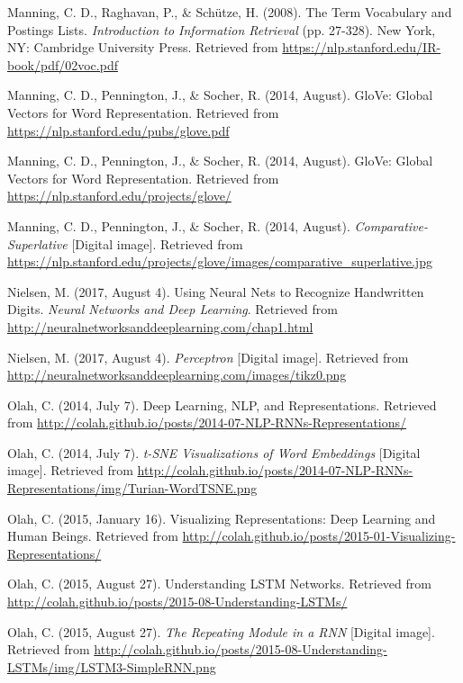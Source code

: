 \begin{thebibliography}{99}
Manning, C. D., Raghavan, P., \& Sch\"utze, H. (2008). The Term Vocabulary and Postings Lists. \textit{Introduction to Information Retrieval} (pp. 27-328). New York, NY: Cambridge University Press. Retrieved from \url{https://nlp.stanford.edu/IR-book/pdf/02voc.pdf}

Manning, C. D., Pennington, J., \& Socher, R. (2014, August). GloVe: Global Vectors for Word Representation. Retrieved from \url{https://nlp.stanford.edu/pubs/glove.pdf}

Manning, C. D., Pennington, J., \& Socher, R. (2014, August). GloVe: Global Vectors for Word Representation. Retrieved from \url{https://nlp.stanford.edu/projects/glove/}

Manning, C. D., Pennington, J., \& Socher, R. (2014, August). \textit{Comparative-Superlative} [Digital image]. Retrieved from \url{https://nlp.stanford.edu/projects/glove/images/comparative\_superlative.jpg}

Nielsen, M. (2017, August 4). Using Neural Nets to Recognize Handwritten Digits. \textit{Neural Networks and Deep Learning}. Retrieved from \url{http://neuralnetworksanddeeplearning.com/chap1.html}

Nielsen, M. (2017, August 4). \textit{Perceptron} [Digital image]. Retrieved from \url{http://neuralnetworksanddeeplearning.com/images/tikz0.png}

Olah, C. (2014, July 7). Deep Learning, NLP, and Representations. Retrieved from \url{http://colah.github.io/posts/2014-07-NLP-RNNs-Representations/}

Olah, C. (2014, July 7). \textit{t-SNE Visualizations of Word Embeddings} [Digital image]. Retrieved from \url{http://colah.github.io/posts/2014-07-NLP-RNNs-Representations/img/Turian-WordTSNE.png}

Olah, C. (2015, January 16). Visualizing Representations: Deep Learning and Human Beings. Retrieved from \url{http://colah.github.io/posts/2015-01-Visualizing-Representations/}

Olah, C. (2015, August 27). Understanding LSTM Networks. Retrieved from \url{http://colah.github.io/posts/2015-08-Understanding-LSTMs/}

Olah, C. (2015, August 27). \textit{The Repeating Module in a RNN} [Digital image]. Retrieved from \url{http://colah.github.io/posts/2015-08-Understanding-LSTMs/img/LSTM3-SimpleRNN.png}


\end{thebibliography}
